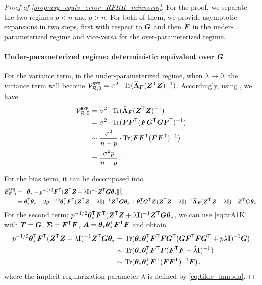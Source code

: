 \begin{proof}[Proof of \cref{prop:asy_equiv_error_RFRR_minnorm}]
For the proof, we separate the two regimes $p<n$ and $p>n$. For both of them, we provide asymptotic expansions in two steps, first with respect to $\bG$ and then $\bF$ in the under-parameterized regime and vice-versa for the over-parameterized regime.


\paragraph{Under-parameterized regime: deterministic equivalent over $\bG$}

For the variance term, in the under-parameterized regime, when $\lambda \to 0$, the variance term will become $\mathcal{V}^{\tt RFM}_{\mathcal{R},0} = \sigma^2 \cdot \Tr(\widehat{\bLambda}_{\bF} (\bZ^\sT \bZ)^{-1})$. Accordingly, using \citet[Eq. (12)]{bach2024high}, we have 
\[
\begin{aligned}
\mathcal{V}^{\tt RFM}_{\mathcal{R},0} =&~ \sigma^2 \cdot \Tr(\widehat{\bLambda}_{\bF} (\bZ^\sT \bZ)^{-1})\\
=&~ \sigma^2 \cdot \Tr(\bF\bF^\sT(\bF\bG^\sT\bG\bF^\sT)^{-1})\\
\sim&~ \frac{\sigma^2}{n-p} \cdot \Tr(\bF\bF^\sT(\bF\bF^\sT)^{-1})\\
=&~\frac{\sigma^2p}{n-p}\,.
\end{aligned}
\]

For the bias term, it can be decomposed into
\[
\begin{aligned}
\mathcal{B}^{\tt RFM}_{\mathcal{R},0} =&~ \|\btheta_* - p^{-1/2} \bF^\sT (\bZ^\sT \bZ + \lambda\id)^{-1} \bZ^\sT \bm{G} \btheta_*\|_2^2\\
=&~ \btheta_*^\sT \btheta_* -2 p^{-1/2}\btheta_*^\sT \bF^\sT (\bZ^\sT \bZ + \lambda\id)^{-1} \bZ^\sT \bm{G} \btheta_* + \btheta_*^\sT \bG^\sT \bZ (\bZ^\sT \bZ + \lambda\id)^{-1} \widehat{\bLambda}_{\bF} (\bZ^\sT \bZ + \lambda\id)^{-1} \bZ^\sT \bm{G} \btheta_*.
\end{aligned}
\]
For the second term: $p^{-1/2}\btheta_*^\sT \bF^\sT (\bZ^\sT \bZ + \lambda\id)^{-1} \bZ^\sT \bm{G} \btheta_*$, we can use \cref{eq:trA1K} with $\bT=\bG$, $\bSigma=\bF^\sT\bF$, $\bA=\btheta_*\btheta_*^\sT \bF^\sT \bF$ and obtain
\[
\begin{aligned}
p^{-1/2}\btheta_*^\sT \bF^\sT (\bZ^\sT \bZ + \lambda\id)^{-1} \bZ^\sT \bm{G} \btheta_* =&~ \Tr( \btheta_*\btheta_*^\sT \bF^\sT \bF \bG^\sT (\bG\bF^\sT\bF\bG^\sT + p\lambda\id)^{-1} \bG)\\
\sim&~ \Tr( \btheta_*\btheta_*^\sT \bF^\sT \bF (\bF^\sT\bF + \tilde\lambda\id)^{-1})\\
\sim&~ \Tr( \btheta_*\btheta_*^\sT \bF^\sT (\bF \bF^\sT)^{-1}\bF)\,,
\end{aligned}
\]
where the implicit regularization parameter $\tilde\lambda$ is defined by \cref{eq:tilde_lambda}.


\end{proof}

